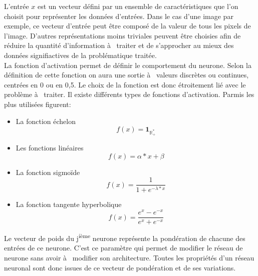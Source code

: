 \documentclass[a4paper,twoside]{report}
\begin{document}
                L'entrée $x$ est un vecteur défini par un ensemble de caractéristiques que l'on choisit pour représenter les données d'entrées. Dans le cas d'une image par exemple, ce vecteur d'entrée peut être composé de la valeur de tous les pixels de l'image. D'autres représentations moins triviales peuvent être choisies afin de réduire la quantité d'information à  traiter et de s'approcher au mieux des données signifiactives de la problématique traitée.\\

                La fonction d'activation permet de définir le comportement du neurone. Selon la définition de cette fonction on aura une sortie à  valeurs discrètes ou continues, centrées en 0 ou en 0,5. Le choix de la fonction est donc étroitement lié avec le problème à  traiter.
                Il existe différents types de fonctions d'activation. Parmis les plus utilisées figurent:
                \begin{itemize}
                    \item La fonction échelon
                    \begin{equation}
                        f(x)=\mathbf{1}_{\mathbb{R}^{*}_{+}}
                    \end{equation}
                    \item Les fonctions linéaires
                    \begin{equation}
                        f(x)=\alpha*x+\beta
                    \end{equation}
                    \item La fonction sigmoïde
                    \begin{equation}
                        f(x)=\frac{1}{1+e^{-\lambda*x}}
                    \end{equation}
                    \item La fonction tangente hyperbolique
                    \begin{equation}
                        f(x)=\frac{e^{x}-e^{-x}}{e^{x}+e^{-x}}
                    \end{equation}
                \end{itemize}

                Le vecteur de poids du j\textsuperscript{ième} neurone représente la pondération de chacune des entrées de ce neurone. C'est ce paramètre qui permet de modifier le réseau de neurone sans avoir à  modifier son architecture. Toutes les propriétés d'un réseau neuronal sont donc issues de ce vecteur de pondération et de ses variations.
\end{document}
